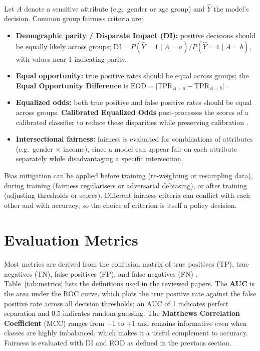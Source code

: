 \documentclass[12pt,a4paper,final]{extreport}
\begin{document}
\paragraph{} Let $A$ denote a sensitive attribute (e.g.\ gender or age group) and $\hat{Y}$ the model's decision. Common group fairness criteria are:
\begin{itemize}
  \item \textbf{Demographic parity / Disparate Impact (DI):} positive decisions should be equally likely across groups; $\mathrm{DI}=P(\hat{Y}=1\mid A=a)/P(\hat{Y}=1\mid A=b)$, with values near 1 indicating parity.
  \item \textbf{Equal opportunity:} true positive rates should be equal across groups; the \textbf{Equal Opportunity Difference} is $\mathrm{EOD}=|\mathrm{TPR}_{A=a}-\mathrm{TPR}_{A=b}|$ \cite{p1}.
  \item \textbf{Equalized odds:} both true positive and false positive rates should be equal across groups. \textbf{Calibrated Equalized Odds} post-processes the scores of a calibrated classifier to reduce these disparities while preserving calibration \cite{p4}.
  \item \textbf{Intersectional fairness:} fairness is evaluated for combinations of attributes (e.g.\ gender $\times$ income), since a model can appear fair on each attribute separately while disadvantaging a specific intersection.
\end{itemize}
Bias mitigation can be applied before training (re-weighting or resampling data), during training (fairness regularisers or adversarial debiasing), or after training (adjusting thresholds or scores). Different fairness criteria can conflict with each other and with accuracy, so the choice of criterion is itself a policy decision.

\section{Evaluation Metrics}

\paragraph{} Most metrics are derived from the confusion matrix of true positives (TP), true negatives (TN), false positives (FP), and false negatives (FN) \cite{p2,p3}. Table~\ref{tab:metrics} lists the definitions used in the reviewed papers. The \textbf{AUC} is the area under the ROC curve, which plots the true positive rate against the false positive rate across all decision thresholds; an AUC of 1 indicates perfect separation and 0.5 indicates random guessing. The \textbf{Matthews Correlation Coefficient} (MCC) ranges from $-1$ to $+1$ and remains informative even when classes are highly imbalanced, which makes it a useful complement to accuracy. Fairness is evaluated with DI and EOD as defined in the previous section.
\end{document}
